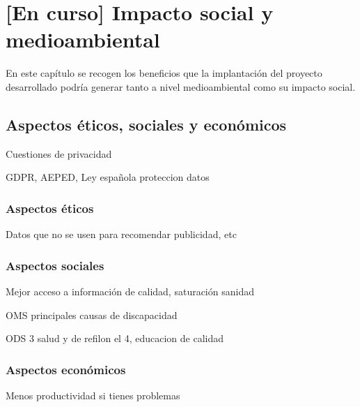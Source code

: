 \chapter{[En curso] Impacto social y medioambiental}
\label{chapter:aspectos}





En este capítulo se recogen los beneficios que la implantación del proyecto desarrollado podría generar tanto a nivel medioambiental como su impacto social.




\section{Aspectos éticos, sociales y económicos}

Cuestiones de privacidad

GDPR, AEPED, Ley española proteccion datos

\subsection{Aspectos éticos}

Datos que no se usen para recomendar publicidad, etc

\subsection{Aspectos sociales}

Mejor acceso a información de calidad, saturación sanidad

OMS principales causas de discapacidad


ODS 3 salud y de refilon el 4, educacion de calidad

\subsection{Aspectos económicos}

Menos productividad si tienes problemas

